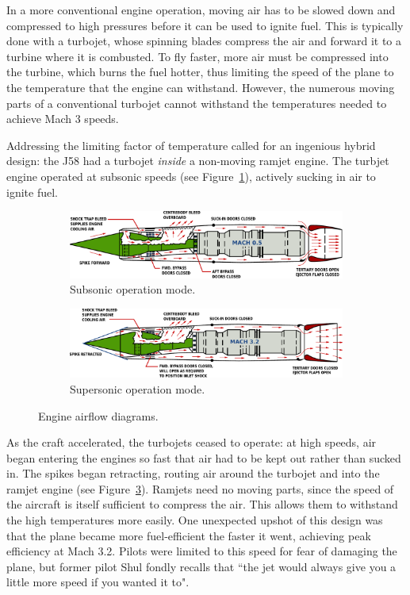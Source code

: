 \documentclass[12pt, draftclsnofoot, onecolumn]{IEEEtran}
\newcommand{\figref}[1]{Figure~\ref{fig:#1}}
\begin{document}
	In a more conventional engine operation, moving air has to be slowed down and compressed to high pressures before it can be used to ignite fuel. This is typically done with a turbojet, whose spinning blades compress the air and forward it to a turbine where it is combusted. To fly faster, more air must be compressed into the turbine, which burns the fuel hotter, thus limiting the speed of the plane to the temperature that the engine can withstand. However, the numerous moving parts of a conventional turbojet cannot withstand the temperatures needed to achieve Mach 3 speeds.
	
	 Addressing the limiting factor of temperature called for an ingenious hybrid design: the J58 had a turbojet \emph{inside} a non-moving ramjet engine. The turbjet engine operated at subsonic speeds (see \figref{subsonic}), actively sucking in air to ignite fuel.
	 
	\begin{figure}[h]
	\centering
		\begin{subfigure}{0.8\textwidth}
			\includegraphics[width=\textwidth]{mach05.pdf}
			\caption{Subsonic operation mode.}\label{fig:subsonic}
		\end{subfigure}
		\begin{subfigure}{0.4\textwidth}
			\includegraphics[width=\textwidth]{mach32.pdf}
			\caption{Supersonic operation mode.}\label{fig:supersonic}
		\end{subfigure}
		\caption{Engine airflow diagrams.}
	\end{figure}
	
	As the craft accelerated, the turbojets ceased to operate: at high speeds, air began entering the engines so fast that air had to be kept out rather than sucked in. The spikes began retracting, routing air around the turbojet and into the ramjet engine (see \figref{supersonic}). Ramjets need no moving parts, since the speed of the aircraft is itself sufficient to compress the air. This allows them to withstand the high temperatures more easily. One unexpected upshot of this design was that the plane became more fuel-efficient the faster it went, achieving peak efficiency at Mach 3.2. Pilots were limited to this speed for fear of damaging the plane, but former pilot Shul fondly recalls that ``the jet would always give you a little more speed if you wanted it to"\cite{sleddriver}.
	
\end{document}
